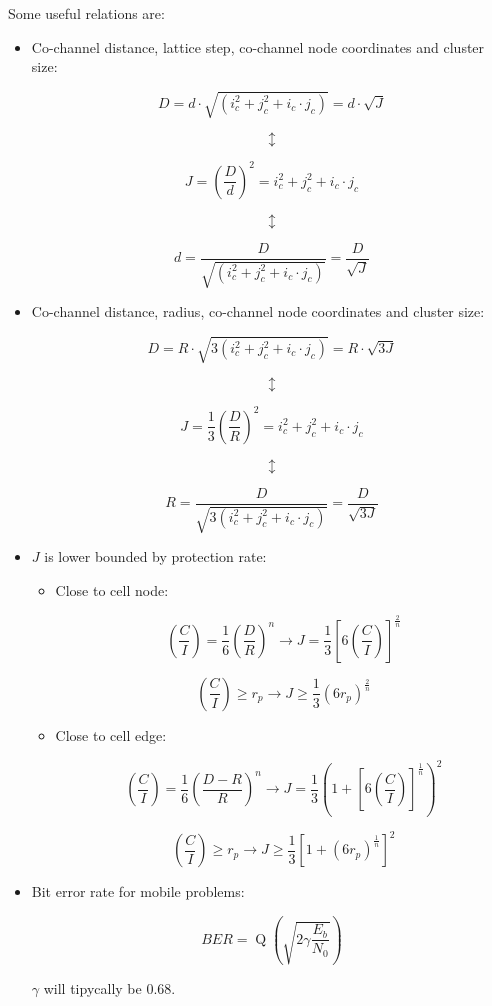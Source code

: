 \documentclass[../main.tex]{subfiles}
\begin{document}
Some useful relations are:
\begin{itemize}
	\item {
		Co-channel distance, lattice step, co-channel node coordinates and cluster size:

		$$
			D = d \cdot \sqrt{(i_{c}^2 + j_{c}^2 + i_{c} \cdot j_{c})} = d \cdot \sqrt{J}
		$$

		$$\updownarrow$$

		$$
			J = \left( \frac {D} {d} \right)^2 = i_{c}^2 + j_{c}^2 + i_{c} \cdot j_{c}
		$$

		$$\updownarrow$$

		$$
			d = \frac {D} {\sqrt{(i_{c}^2 + j_{c}^2 + i_{c} \cdot j_{c})}} = \frac{D}{\sqrt{J}}
		$$
	}
	\item {
		Co-channel distance, radius, co-channel node coordinates and cluster size:

		$$
			D = R \cdot \sqrt{3 (i_{c}^2 + j_{c}^2 + i_{c} \cdot j_{c})} = R \cdot \sqrt{3 J}
		$$

		$$\updownarrow$$

		$$
			J = \frac{1}{3} \left( \frac{D}{R} \right)^2 = i_{c}^2 + j_{c}^2 + i_{c} \cdot j_{c}
		$$

		$$\updownarrow$$

		$$
			R = \frac {D} {\sqrt{3 (i_{c}^2 + j_{c}^2 + i_{c} \cdot j_{c})}} = \frac{D}{\sqrt{3 J}}
		$$
	}
	\item {
		$J$ is lower bounded by protection rate:
		\begin{itemize}
			\item {
				Close to cell node:

				$$
					\left( \frac{C}{I} \right) = \frac {1} {6} \left( \frac {D} {R} \right)^n \rightarrow
					J = \frac {1} {3} \left[ 6 \left( \frac{C}{I} \right) \right]^{\frac {2} {n}}
				$$

				$$
					\left( \frac{C}{I} \right) \geq r_p \rightarrow
					J \geq \frac {1} {3} \left( 6 r_p \right)^{\frac{2}{n}}
				$$
			}
			\item {
				Close to cell edge:

				$$
					\left( \frac{C}{I} \right) = \frac {1} {6} \left( \frac {D - R} {R} \right)^n \rightarrow
					J = \frac {1} {3} \left( 1 + \left[ 6 \left( \frac{C}{I} \right) \right]^{\frac {1} {n}} \right)^2
				$$

				$$
					\left( \frac{C}{I} \right) \geq r_p \rightarrow
					J \geq \frac {1} {3} \left[ 1 + \left( 6 r_p \right)^{\frac{1}{n}} \right]^2
				$$
			}
		\end{itemize}
	}
	\item {
		Bit error rate for mobile problems:

		$$
			BER = \operatorname{Q} \left( \sqrt{2 \gamma \frac{E_b}{N_0}} \right)
		$$

		$\gamma$ will tipycally be 0.68.
	}
\end{itemize}
\end{document}

